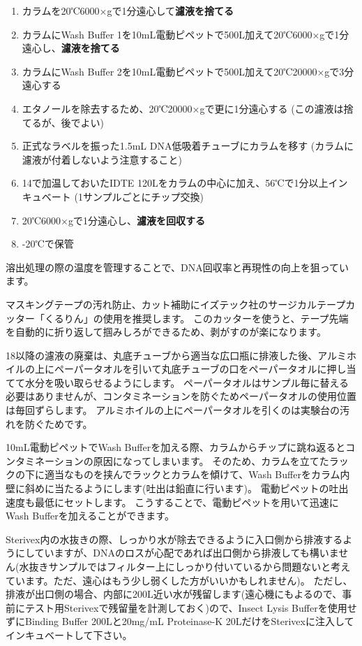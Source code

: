\documentclass[titlepage,10pt,a4paper,uplatex]{jsbook}
\renewcommand{\textbf}[1]{{\bfseries\sffamily#1}}
\begin{document}
\begin{enumerate}
\item カラムを20℃6000×gで1分遠心して\textbf{濾液を捨てる}
\item カラムにWash Buffer 1を10mL電動ピペットで500{\textmu}L加えて20℃6000×gで1分遠心し、\textbf{濾液を捨てる}
\item カラムにWash Buffer 2を10mL電動ピペットで500{\textmu}L加えて20℃20000×gで3分遠心する
\item エタノールを除去するため、20℃20000×gで更に1分遠心する (この濾液は捨てるが、後でよい)
\item 正式なラベルを振った1.5mL DNA低吸着チューブにカラムを移す (カラムに濾液が付着しないよう注意すること)
\item 14で加温しておいたIDTE 120{\textmu}Lをカラムの中心に加え、56℃で1分以上インキュベート (1サンプルごとにチップ交換)
\item 20℃6000×gで1分遠心し、\textbf{濾液を回収する}
\item -20℃で保管
\end{enumerate}

溶出処理の際の温度を管理することで、DNA回収率と再現性の向上を狙っています。

マスキングテープの汚れ防止、カット補助にイズテック社のサージカルテープカッター「くるりん」の使用を推奨します。
このカッターを使うと、テープ先端を自動的に折り返して掴みしろができるため、剥がすのが楽になります。

18以降の濾液の廃棄は、丸底チューブから適当な広口瓶に排液した後、アルミホイルの上にペーパータオルを引いて丸底チューブの口をペーパータオルに押し当てて水分を吸い取らせるようにします。
ペーパータオルはサンプル毎に替える必要はありませんが、コンタミネーションを防ぐためペーパータオルの使用位置は毎回ずらします。
アルミホイルの上にペーパータオルを引くのは実験台の汚れを防ぐためです。

10mL電動ピペットでWash Bufferを加える際、カラムからチップに跳ね返るとコンタミネーションの原因になってしまいます。
そのため、カラムを立てたラックの下に適当なものを挟んでラックとカラムを傾けて、Wash Bufferをカラム内壁に斜めに当たるようにします(吐出は鉛直に行います)。
電動ピペットの吐出速度も最低にセットします。
こうすることで、電動ピペットを用いて迅速にWash Bufferを加えることができます。

Sterivex内の水抜きの際、しっかり水が除去できるように入口側から排液するようにしていますが、DNAのロスが心配であれば出口側から排液しても構いません(水抜きサンプルではフィルター上にしっかり付いているから問題ないと考えています。ただ、遠心はもう少し弱くした方がいいかもしれません)。
ただし、排液が出口側の場合、内部に200{\textmu}L近い水が残留します(遠心機にもよるので、事前にテスト用Sterivexで残留量を計測しておく)ので、Insect Lysis Bufferを使用せずにBinding Buffer 200{\textmu}Lと20mg/mL Proteinase-K 20{\textmu}LだけをSterivexに注入してインキュベートして下さい。
\end{document}
